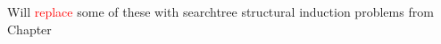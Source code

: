 \documentclass[handout]{mcs}
\begin{document}

\begin{staffnotes}
Will \textcolor{red}{replace} some of these with searchtree structural
induction problems from
Chapter~
\end{staffnotes}











\end{document}
